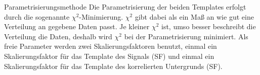 Parametrisierungsmethode
Die Parametrisierung der beiden Templates erfolgt durch die sogenannte $\chi^{2}$-Minimierung.
$\chi^{2}$ gibt dabei als ein Ma{\ss} an wie gut eine Verteilung an gegebene Daten passt.
Je kleiner $\chi^{2}$ ist, umso besser beschreibt die Verteilung die Daten, deshalb wird $\chi^{2}$ bei der Parametrisierung minimiert.
Als freie Parameter werden zwei Skalierungsfaktoren benutzt, einmal ein Skalierungsfaktor f\"ur das Template des Signals (SF) und einmal ein Skalierungsfaktor f\"ur das Template des korrelierten Untergrunds (SF).